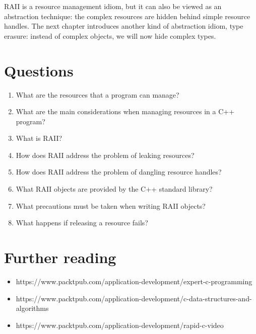 RAII is a resource management idiom, but it can also be viewed as an abstraction technique: the complex resources are hidden behind simple resource handles. The next chapter introduces another kind of abstraction idiom, type erasure: instead of complex objects, we will now hide complex types.

\section{Questions}

\begin{enumerate}
\item
  What are the resources that a program can manage?
\item
  What are the main considerations when managing resources in a C++ program?
\item
  What is RAII?
\item
  How does RAII address the problem of leaking resources?
\item
  How does RAII address the problem of dangling resource handles?
\item
  What RAII objects are provided by the C++ standard library?
\item
  What precautions must be taken when writing RAII objects?
\item
  What happens if releasing a resource fails?
\end{enumerate}

\section{Further reading}

\begin{itemize}
\item
  https://www.packtpub.com/application-development/expert-c-programming
\item
  https://www.packtpub.com/application-development/c-data-structures-and-algorithms
\item
  https://www.packtpub.com/application-development/rapid-c-video
\end{itemize}

